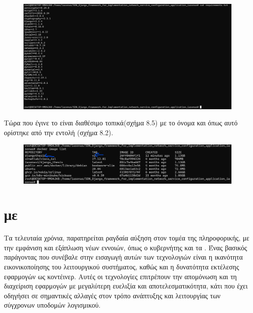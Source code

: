 \FloatBarrier

\FloatBarrier

\begin{figure}[h]
	\centering
	\includegraphics[width=1.0\textwidth]{graphics/requirements.png}
	\caption{}
\end{figure}

\FloatBarrier

\noindent Τώρα που έγινε  το  είναι διαθέσιμο τοπικά(σχήμα 8.5) με το όνομα  και  όπως αυτό ορίστηκε από την εντολή (σχήμα 8.2).

\FloatBarrier


\begin{figure}[h]
	\centering
	\includegraphics[width=1.5\textwidth]{graphics/docker_image_list_2.png}
	\caption{}
\end{figure}

\FloatBarrier



\section{ με }

Τα τελευταία χρόνια, παρατηρείται ραγδαία αύξηση στον τομέα της πληροφορικής, 
με την εμφάνιση και εξάπλωση νέων εννοιών, όπως ο κυβερνήτης και τα . 
Ένας βασικός παράγοντας που συνέβαλε στην εισαγωγή αυτών των τεχνολογιών είναι η ικανότητα εικονικοποίησης 
του λειτουργικού συστήματος, καθώς και η δυνατότητα εκτέλεσης εφαρμογών ως κοντέινερ. 
Αυτές οι τεχνολογίες επιτρέπουν την απομόνωση και τη διαχείριση εφαρμογών με μεγαλύτερη ευελιξία και 
αποτελεσματικότητα, κάτι που έχει οδηγήσει σε σημαντικές αλλαγές στον τρόπο ανάπτυξης και λειτουργίας των σύγχρονων υποδομών λογισμικού.

